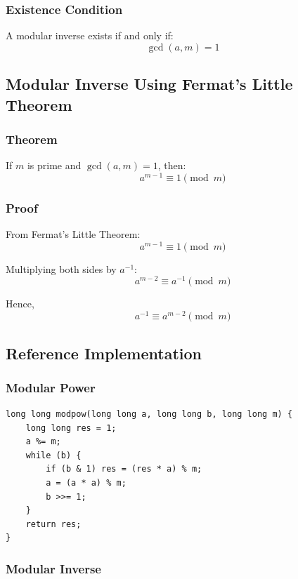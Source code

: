 \documentclass[11pt]{article}
\begin{document}
\subsubsection{Existence Condition}
A modular inverse exists if and only if:
\[
\gcd(a, m) = 1
\]

\subsection{Modular Inverse Using Fermat's Little Theorem}

\subsubsection{Theorem}
If $m$ is prime and $\gcd(a, m) = 1$, then:
\[
a^{m-1} \equiv 1 \pmod{m}
\]

\subsubsection{Proof}
From Fermat's Little Theorem:
\[
a^{m-1} \equiv 1 \pmod{m}
\]

Multiplying both sides by $a^{-1}$:
\[
a^{m-2} \equiv a^{-1} \pmod{m}
\]

Hence,
\[
\boxed{a^{-1} \equiv a^{m-2} \pmod{m}}
\]

\subsection{Reference Implementation}

\subsubsection{Modular Power}

\begin{lstlisting}
long long modpow(long long a, long long b, long long m) {
    long long res = 1;
    a %= m;
    while (b) {
        if (b & 1) res = (res * a) % m;
        a = (a * a) % m;
        b >>= 1;
    }
    return res;
}
\end{lstlisting}

\subsubsection{Modular Inverse}
\end{document}
